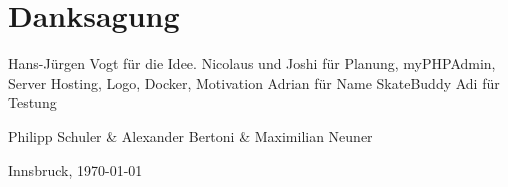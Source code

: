 \section*{Danksagung}

Hans-Jürgen Vogt für die Idee.
Nicolaus und Joshi für Planung, myPHPAdmin, Server Hosting, Logo, Docker, Motivation
Adrian für Name SkateBuddy
Adi für Testung

\vspace{1cm}

Philipp Schuler \& Alexander Bertoni \& Maximilian Neuner

Innsbruck, \today

\newpage